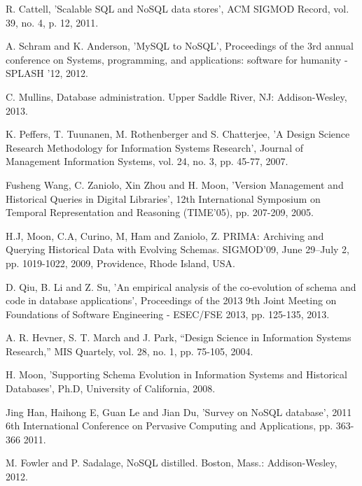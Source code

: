 \begin{thebibliography}{69}


 R. Cattell, 'Scalable SQL and NoSQL data stores', ACM SIGMOD Record, vol. 39, no. 4, p. 12, 2011.

 A. Schram and K. Anderson, 'MySQL to NoSQL', Proceedings of the 3rd annual conference on Systems, programming, and applications: software for humanity - SPLASH '12, 2012.

 C. Mullins, Database administration. Upper Saddle River, NJ: Addison-Wesley, 2013.

 K.  Peffers, T.  Tuunanen, M.  Rothenberger and S.  Chatterjee, 'A Design Science Research Methodology for Information Systems Research', Journal of Management Information Systems, vol. 24, no. 3, pp. 45-77, 2007.

 Fusheng Wang, C. Zaniolo, Xin Zhou and H. Moon, 'Version Management and Historical Queries in Digital Libraries', 12th International Symposium on Temporal Representation and Reasoning (TIME'05), pp. 207-209, 2005.

 H.J, Moon, C.A, Curino, M, Ham and Zaniolo, Z. PRIMA: Archiving and Querying Historical Data with Evolving Schemas. SIGMOD’09, June 29–July 2, pp. 1019-1022, 2009, Providence, Rhode Island, USA.

 D. Qiu, B. Li and Z. Su, 'An empirical analysis of the co-evolution of schema and code in database applications', Proceedings of the 2013 9th Joint Meeting on Foundations of Software Engineering - ESEC/FSE 2013, pp. 125-135, 2013.

 A. R. Hevner, S. T. March and J. Park, “Design Science in Information Systems
Research,” MIS Quartely, vol. 28, no. 1, pp. 75-105, 2004.

 H. Moon, 'Supporting Schema Evolution in Information Systems and Historical Databases', Ph.D, University of California, 2008.

 Jing Han, Haihong E, Guan Le and Jian Du, 'Survey on NoSQL database', 2011 6th International Conference on Pervasive Computing and Applications, pp. 363-366 2011.

 M. Fowler and P. Sadalage, NoSQL distilled. Boston, Mass.: Addison-Wesley, 2012.


\end{thebibliography}
